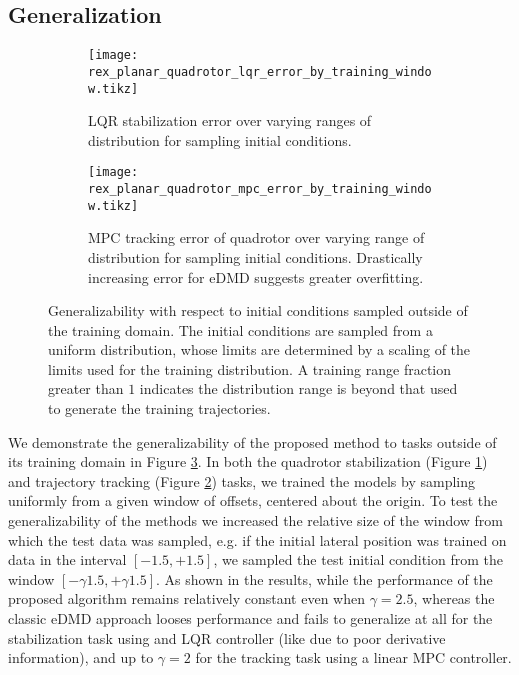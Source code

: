\documentclass{article}
\begin{document}
\subsection{Generalization}
\begin{figure}[t] \centering
  \begin{subfigure}[t]{0.45\textwidth}
    \texttt{[image: rex\_planar\_quadrotor\_lqr\_error\_by\_training\_window.tikz]}
    \caption{LQR stabilization error over varying ranges of distribution for sampling
    initial conditions. 
    }
    \label{fig:rex_planar_quadrotor_lqr_error_by_training_window}
  \end{subfigure}
  \hfill
  \begin{subfigure}[t]{0.48\textwidth}
    \raggedright
    \texttt{[image: rex\_planar\_quadrotor\_mpc\_error\_by\_training\_window.tikz]}
    \caption{MPC tracking error of quadrotor over varying range of distribution for sampling
    initial conditions. Drastically increasing error for eDMD suggests greater overfitting.
    }
    \label{fig:rex_planar_quadrotor_mpc_error_by_training_window}
  \end{subfigure}
  \caption{Generalizability with respect to initial conditions sampled outside of the 
  training domain. The initial conditions are sampled from a uniform distribution, whose 
  limits are determined by a scaling of the limits used for the training distribution. 
  A training range fraction greater than $1$ indicates the
  distribution range is beyond that used to generate the training trajectories.
  }
  \label{fig:training_window}
\end{figure}

We demonstrate the generalizability of the proposed method to tasks outside of its training
domain in Figure \ref{fig:training_window}. In both the quadrotor 
stabilization (Figure \ref{fig:rex_planar_quadrotor_lqr_error_by_training_window}) and 
trajectory tracking (Figure \ref{fig:rex_planar_quadrotor_mpc_error_by_training_window})
tasks, we trained the models by sampling uniformly from a given window of offsets, centered 
about the origin. 
To test the generalizability of the methods we increased the relative size of the window 
from which the test data was sampled, e.g. if the initial lateral position was trained on 
data in the interval $[-1.5,+1.5]$, we sampled the test initial condition from the window 
$[-\gamma 1.5, +\gamma 1.5]$. As shown in the results, while the performance of the proposed
algorithm remains relatively constant even when $\gamma = 2.5$, whereas the classic eDMD 
approach looses performance and fails to generalize at all for the stabilization task using 
and LQR controller (like due to poor derivative information), and up to $\gamma = 2$ for the 
tracking task using a linear MPC controller.
\end{document}
